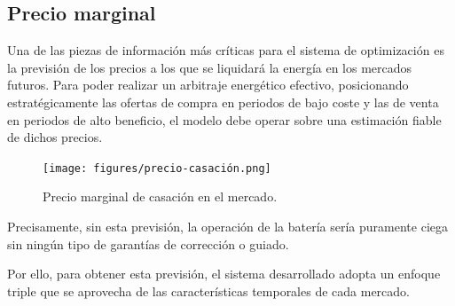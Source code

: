 \subsection{Precio marginal}
\label{makereference4.1.1}

Una de las piezas de información más críticas para el sistema de optimización es la previsión de los precios a los que se liquidará la energía en los mercados futuros. Para poder realizar un arbitraje energético efectivo, posicionando estratégicamente las ofertas de compra en periodos de bajo coste y las de venta en periodos de alto beneficio, el modelo debe operar sobre una estimación fiable de dichos precios.

\begin{figure}
  \centering
  \texttt{[image: figures/precio-casación.png]}
  \caption{Precio marginal de casación en el mercado.}
  \label{fig:precio-casación}
\end{figure}

Precisamente, sin esta previsión, la operación de la batería sería puramente ciega sin ningún tipo de garantías de corrección o guiado.

Por ello, para obtener esta previsión, el sistema desarrollado adopta un enfoque triple que se aprovecha de las características temporales de cada mercado.

